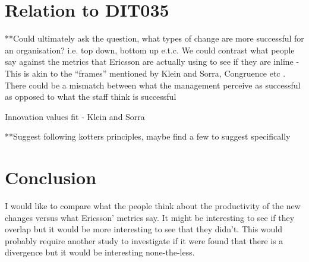 \documentclass[conference]{IEEEtran}
\begin{document}
\section{Relation to DIT035}

**Could ultimately ask the question, what types of change are more successful for an organisation? i.e. top down, bottom up e.t.c. We could contrast what people say against the metrics that Ericsson are actually using to see if they are inline - This is akin to the “frames” mentioned by Klein and Sorra, Congruence etc \cite{klein1996challenge}. There could be a mismatch between what the management perceive as successful as opposed to what the staff think is successful

Innovation values fit - Klein and Sorra

**Suggest following kotters principles, maybe find a few to suggest specifically \cite{kotter1995leading}

\section{Conclusion}

I would like to compare what the people think about the productivity of the new changes versus what Ericsson' metrics say. It might be interesting to see if they overlap but it would be more interesting to see that they didn't. This would probably require another study to investigate if it were found that there is a divergence but it would be interesting none-the-less.

{}


\end{document}
